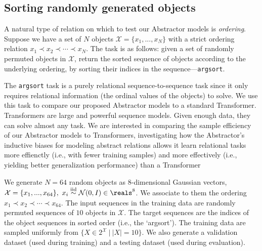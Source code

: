 \subsection{Sorting randomly generated objects}
\label{ssec:random_object_argsort}
\def\subtask#1{\noindent{\it\bfseries #1.}}


A natural type of relation on which to test our Abstractor models is \textit{ordering}. Suppose we have a set of $N$
objects $\mathcal{X} = \{ x_1 , ..., x_N \}$ with a strict ordering relation $x_1 \prec x_2 \prec \cdots \prec x_N$. The task is as follows: given a set of randomly permuted objects in $\mathcal{X}$, return the sorted sequence of objects according to the underlying ordering, by sorting their indices in the sequence---\texttt{argsort}.

The \texttt{argsort} task is a purely relational sequence-to-sequence task since it only requires relational
information (the ordinal values of the objects) to solve. We use this task to compare our proposed Abstractor models
to a standard Transformer.
Transformers are large and powerful sequence models. Given enough data, they can solve almost any task. We are interested in comparing the sample efficiency of our Abstractor models to Transformers, investigating how the Abstractor's
inductive biases for modeling abstract relations allows it
learn relational tasks more effienctly (i.e., with fewer training samples) and more effectively (i.e., yielding
better generalization performance) than a Transformer

\subtask{Random object sorting task} We generate $N=64$ random objects as 8-dimensional Gaussian vectors, $\mathcal{X} = \{ x_1 , ..., x_{64} \}, \ x_i \overset{\mathrm{iid}}{\sim} \mathcal{N}(0, I) \in \reals^8$. We associate to them the ordering $x_1 \prec x_2 \prec \cdots \prec x_{64}$. The input sequences in the training data are randomly permuted sequences of $10$ objects in $\mathcal{X}$. The target sequences are the indices of the object sequences in sorted order (i.e., the `argsort'). The training data are sampled uniformly from $\{ X \in 2^\mathcal{X} \ \vert \ |X| = 10\}$. We also generate a validation dataset (used during training) and a testing dataset (used during evaluation).

